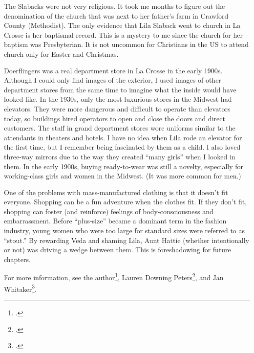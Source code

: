 \documentclass[
  letterpaper,
]{book}
\begin{document}
The Slabacks were not very religious. It took me months to figure out
the denomination of the church that was next to her father's farm in
Crawford County (Methodist). The only evidence that Lila Slaback went to
church in La Crosse is her baptismal record. This is a mystery to me
since the church for her baptism was Presbyterian. It is not uncommon
for Christians in the US to attend church only for Easter and Christmas.

Doerflingers was a real department store in La Crosse in the early
1900s. Although I could only find images of the exterior, I used images
of other department stores from the same time to imagine what the inside
would have looked like. In the 1930s, only the most luxurious stores in
the Midwest had elevators. They were more dangerous and difficult to
operate than elevators today, so buildings hired operators to open and
close the doors and direct customers. The staff in grand department
stores wore uniforms similar to the attendants in theaters and hotels. I
have no idea when Lila rode an elevator for the first time, but I
remember being fascinated by them as a child. I also loved three-way
mirrors due to the way they created ``many girls'' when I looked in
them. In the early 1900s, buying ready-to-wear was still a novelty,
especially for working-class girls and women in the Midwest. (It was
more common for men.)

One of the problems with mass-manufactured clothing is that it doesn't
fit everyone. Shopping can be a fun adventure when the clothes fit. If
they don't fit, shopping can foster (and reinforce) feelings of
body-consciousness and embarrassment. Before ``plus-size'' became a
dominant term in the fashion industry, young women who were too large
for standard sizes were referred to as ``stout.'' By rewarding Veda and
shaming Lila, Aunt Hattie (whether intentionally or not) was driving a
wedge between them. This is foreshadowing for future chapters.

For more information, see the author\footnote{.}, Lauren Downing Peters\footnote{.}, and Jan Whitaker\footnote{.}.

\end{document}
